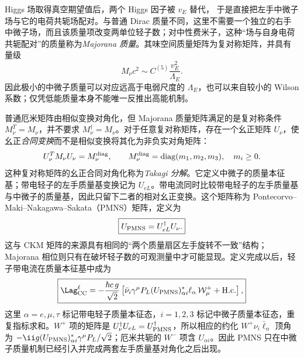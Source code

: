 Higgs 场取得真空期望值后，两个 Higgs 因子被 $v_E$ 替代， 于是直接把左手中微子场与它的电荷共轭场配对。与普通 Dirac 质量不同，这里不需要一个独立的右手中微子场，而且该质量项改变两单位轻子数；对中性费米子，这种“场与自身电荷共轭配对”的质量称为\emph{Majorana 质量}。其味空间质量矩阵为复对称矩阵，并具有量级
\begin{equation}
\boxed{
M_\nu c^2\sim C^{(5)}\frac{v_E^2}{\Lambda_E}.}
\label{eq:neutrino-mass-weinberg-dp11}
\end{equation}
因此极小的中微子质量可以对应远高于电弱尺度的 $\Lambda_E$，也可以来自较小的 Wilson 系数；仅凭低能质量本身不能唯一反推出高能机制。

普通厄米矩阵由相似变换对角化，但 Majorana 质量矩阵满足的是复对称条件 $M_\nu^T=M_\nu$，并不要求 $M_\nu^\dagger=M_\nu$。对于任意复对称矩阵，存在一个幺正矩阵 $U_\nu$，使幺正\emph{合同变换}而不是相似变换将其化为非负实对角矩阵：
\begin{equation*}
U_\nu^TM_\nu U_\nu=M_\nu^{\rm diag},
\qquad M_\nu^{\rm diag}=\operatorname{diag}(m_1,m_2,m_3),\quad m_i\ge0.
\end{equation*}
这种复对称矩阵的幺正合同对角化称为\emph{Takagi 分解}。它定义中微子的质量本征基；带电轻子的左手质量基变换记为 $U_{eL}$。带电流同时比较带电轻子的左手质量基与中微子的质量基，因此只留下二者的相对幺正变换。这个矩阵称为 Pontecorvo--Maki--Nakagawa--Sakata（PMNS）矩阵，定义为
\begin{equation}
\boxed{U_{\rm PMNS}=U_{eL}^\dagger U_\nu.}
\label{eq:pmns-definition-dp11}
\end{equation}
这与 CKM 矩阵的来源具有相同的“两个质量扇区左手旋转不一致”结构；Majorana 相位则只有在破坏轻子数的可观测量中才可能显现。定义完成以后，轻子带电流在质量本征基中成为
\begin{equation}
\boxed{
 \Lag_{\rm CC}^{\ell}
 =-\frac{\hbar c\,g}{\sqrt2}
 \left[\bar\nu_i\gamma^\mu P_L(U_{\rm PMNS})_{\alpha i}^*\ell_\alpha\,\mathcal W_\mu^+
 +\mathrm{H.c.}\right],}
\label{eq:pmns-charged-current-dp43}
\end{equation}
这里 $\alpha=e,\mu,\tau$ 标记带电轻子质量本征态，$i=1,2,3$ 标记中微子质量本征态，重复指标求和。$W^+$ 项的矩阵是 $U_\nu^\dagger U_{eL}=U_{\rm PMNS}^\dagger$，所以相应的约化 $W^+\nu_i\bar\ell_\alpha$ 顶角为 $-\ii g(U_{\rm PMNS})_{\alpha i}^*\gamma^\mu P_L/\sqrt2$；厄米共轭的 $W^-$ 项含 $U_{\alpha i}$。因此 PMNS 只在中微子质量机制已经引入并完成两套左手质量基对角化之后出现。

